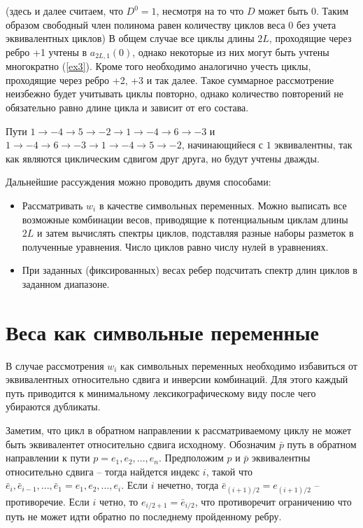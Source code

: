 \documentclass[specification,annotation,times]{itmo-student-thesis}
\begin{document}
(здесь и далее считаем, что $D^0=1$, несмотря на то что $D$ может быть $0$. Таким образом
свободный член полинома равен количеству циклов веса $0$ без учета эквивалентных циклов)
В общем случае все циклы длины $2L$, проходящие через ребро +1 учтены в $a_{2L,1}(0)$, однако
некоторые из них могут быть учтены многократно (\ref{ex3}). Кроме того необходимо аналогично учесть
циклы, проходящие через ребро +2, +3 и так далее. Такое суммарное рассмотрение неизбежно
будет учитывать циклы повторно, однако количество повторений не обязательно равно длине цикла и
зависит от его состава.
\begin{example} \label{ex3}

 Пути $1 \to -4 \to 5 \to -2 \to 1 \to -4 \to 6 \to -3$ и $1 \to -4 \to 6 \to -3 \to 1 \to -4 \to 5 \to -2$,
начинающийеся с $1$ эквивалентны, так как являются циклическим сдвигом друг друга, но будут учтены дважды. 
\end{example}

Дальнейшие рассуждения можно проводить двумя способами:
\begin{itemize}
  \item
  Рассматривать $w_i$ в качестве символьных переменных. 
Можно выписать все возможные комбинации весов, приводящие к потенциальным 
циклам длины $2L$ и затем вычислять спектры циклов, подставляя разные 
наборы разметок в полученные уравнения. Число циклов равно числу нулей в уравнениях.  
\item
  При заданных (фиксированных) весах ребер подсчитать спектр длин циклов в заданном диапазоне.
\end{itemize}

\section{Веса как символьные переменные}
В случае рассмотрения $w_i$ как символьных переменных необходимо избавиться от эквивалентных
относительно сдвига и инверсии комбинаций. Для этого каждый путь приводится к минимальному 
лексикографическому виду после чего убираются дубликаты. 

Заметим, что цикл в обратном направлении
к рассматриваемому циклу не может быть эквивалентет относительно сдвига исходному.
Обозначим $\bar{p}$ путь в обратном направлении к пути $p=e_1,e_2,...,e_n$. 
Предположим $p$ и $\bar{p}$ эквивалентны относительно сдвига -- тогда найдется индекс $i$, такой что
$\bar{e}_i, \bar{e}_{i-1}, ..., \bar{e}_1 = e_1, e_2, ..., e_i$.  Если $i$ нечетно, тогда $\bar{e}_{(i + 1)/2} = e_{(i+1)/2}$ -- противоречие.
 Если $i$ четно, то $e_{i/2 + 1}=\bar{e}_{i/2}$, что противоречит ограничению что путь не может
идти обратно по последнему пройденному ребру.
\end{document}
